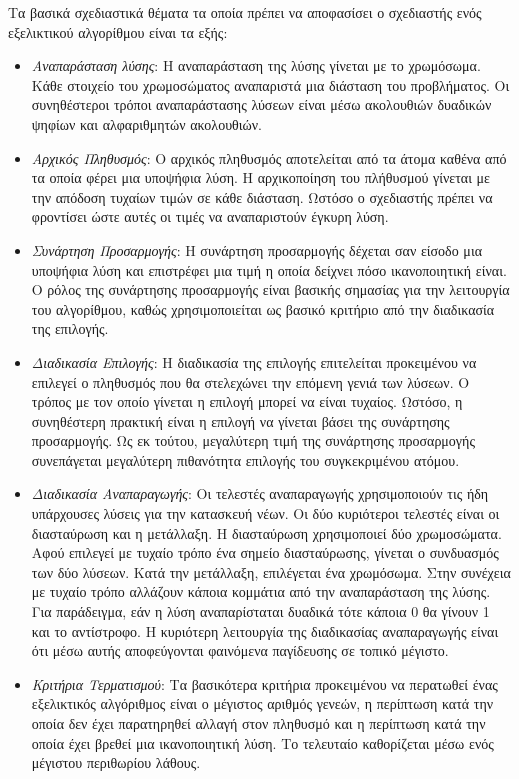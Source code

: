 \documentclass{assignment}
\begin{document}
Τα βασικά σχεδιαστικά θέματα τα οποία πρέπει να αποφασίσει ο σχεδιαστής
ενός εξελικτικού αλγορίθμου είναι τα εξής:
\begin{itemize}
    \item \emph{Αναπαράσταση λύσης}: Η αναπαράσταση της λύσης γίνεται με το
χρωμόσωμα. Κάθε στοιχείο του χρωμοσώματος αναπαριστά μια διάσταση του
προβλήματος. Οι συνηθέστεροι τρόποι αναπαράστασης λύσεων είναι μέσω ακολουθιών
δυαδικών ψηφίων και αλφαριθμητών ακολουθιών.
    \item \emph{Αρχικός Πληθυσμός}: Ο αρχικός πληθυσμός αποτελείται από τα
άτομα καθένα από τα οποία φέρει μια υποψήφια λύση. Η αρχικοποίηση του πλήθυσμού
γίνεται με την απόδοση τυχαίων τιμών σε κάθε διάσταση. Ωστόσο ο σχεδιαστής
πρέπει να φροντίσει ώστε αυτές οι τιμές να αναπαριστούν έγκυρη λύση.
    \item \emph{Συνάρτηση Προσαρμογής}: Η συνάρτηση προσαρμογής δέχεται σαν
είσοδο μια υποψήφια λύση και επιστρέφει μια τιμή η οποία δείχνει πόσο
ικανοποιητική είναι. Ο ρόλος της συνάρτησης προσαρμογής είναι βασικής
σημασίας για την λειτουργία του αλγορίθμου, καθώς χρησιμοποιείται ως βασικό
κριτήριο από την διαδικασία της επιλογής.
    \item \emph{Διαδικασία Επιλογής}: Η διαδικασία της επιλογής επιτελείται
προκειμένου να επιλεγεί ο πληθυσμός που θα στελεχώνει την επόμενη γενιά των
λύσεων. Ο τρόπος με τον οποίο γίνεται η επιλογή μπορεί να είναι τυχαίος.
Ωστόσο, η συνηθέστερη πρακτική είναι η επιλογή να γίνεται βάσει της συνάρτησης
προσαρμογής. Ως εκ τούτου, μεγαλύτερη τιμή της συνάρτησης προσαρμογής
συνεπάγεται μεγαλύτερη πιθανότητα επιλογής του συγκεκριμένου ατόμου.
    \item \emph{Διαδικασία Αναπαραγωγής}: Οι τελεστές αναπαραγωγής χρησιμοποιούν
τις ήδη υπάρχουσες λύσεις για την κατασκευή νέων. Οι δύο κυριότεροι τελεστές
είναι οι διασταύρωση και η μετάλλαξη. Η διασταύρωση χρησιμοποιεί δύο
χρωμοσώματα. Αφού επιλεγεί με τυχαίο τρόπο ένα σημείο διασταύρωσης, γίνεται
ο συνδυασμός των δύο λύσεων. Κατά την μετάλλαξη, επιλέγεται ένα χρωμόσωμα.
Στην συνέχεια με τυχαίο τρόπο αλλάζουν κάποια κομμάτια από την αναπαράσταση της
λύσης. Για παράδειγμα, εάν η λύση αναπαρίσταται δυαδικά τότε κάποια 0 θα γίνουν
1 και το αντίστροφο. Η κυριότερη λειτουργία της διαδικασίας αναπαραγωγής είναι
ότι μέσω αυτής αποφεύγονται φαινόμενα παγίδευσης σε τοπικό μέγιστο.
    \item \emph{Κριτήρια Τερματισμού}: Τα βασικότερα κριτήρια προκειμένου να
περατωθεί ένας εξελικτικός αλγόριθμος είναι ο μέγιστος αριθμός γενεών, η
περίπτωση κατά την οποία δεν έχει παρατηρηθεί αλλαγή στον πληθυσμό και η
περίπτωση κατά την οποία έχει βρεθεί μια ικανοποιητική λύση. Το τελευταίο
καθορίζεται μέσω ενός μέγιστου περιθωρίου λάθους.
\end{itemize}
\end{document}
